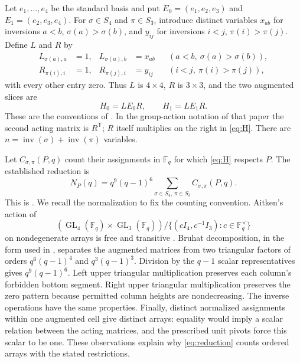 \documentclass[11pt]{article}
\newcommand{\F}{\mathbb F}
\newcommand{\inv}{\operatorname{inv}}
\newcommand{\GL}{\operatorname{GL}}
\begin{document}
Let $e_1,\ldots,e_4$ be the standard basis and put
$E_0=(e_1,e_2,e_3)$ and $E_1=(e_2,e_3,e_4)$.
For $\sigma\in S_4$ and $\pi\in S_3$, introduce distinct variables
$x_{ab}$ for inversions $a<b$, $\sigma(a)>\sigma(b)$, and $y_{ij}$
for inversions $i<j$, $\pi(i)>\pi(j)$. Define $L$ and $R$ by
\begin{align}
 L_{\sigma(a),a}&=1,&
 L_{\sigma(a),b}&=x_{ab}
       &&(a<b,\ \sigma(a)>\sigma(b)),\label{eq:L}\\
 R_{\pi(i),i}&=1,&
 R_{\pi(j),i}&=y_{ij}
       &&(i<j,\ \pi(i)>\pi(j)),\label{eq:R}
\end{align}
with every other entry zero. Thus $L$ is $4\times4$, $R$ is $3\times3$,
and the two augmented slices are
\begin{equation}\label{eq:H}
 H_0=LE_0R,\qquad H_1=LE_1R.
\end{equation}
These are the conventions of \cite[Definitions 4.5--4.7]{KL}.
In the group-action notation of that paper the second acting matrix is
$R^{\mathsf T}$; $R$ itself multiplies on the right in \eqref{eq:H}.
There are $n=\inv(\sigma)+\inv(\pi)$ variables.

Let $C_{\sigma,\pi}(P,q)$ count their assignments in $\F_q$ for which
\eqref{eq:H} respects $P$. The established reduction is
\begin{equation}\label{eq:reduction}
 N_P(q)=q^9(q-1)^6
       \sum_{\sigma\in S_4,\,\pi\in S_3}C_{\sigma,\pi}(P,q).
\end{equation}
This is \cite[Corollary 4.2]{KL}. We recall the normalization to fix the
counting convention. Aitken's action of
\[
 (\GL_4(\F_q)\times\GL_3(\F_q))/
 \{(cI_4,c^{-1}I_3):c\in\F_q^\times\}
\]
on nondegenerate arrays is free and transitive \cite{Aitken}.
Bruhat decomposition, in the form used in \cite[Theorem 4.3]{KL},
separates the augmented matrices from two triangular factors of orders
$q^6(q-1)^4$ and $q^3(q-1)^3$. Division by the $q-1$ scalar
representatives gives $q^9(q-1)^6$.
Left upper triangular multiplication preserves each column's forbidden
bottom segment. Right upper triangular multiplication preserves the zero
pattern because permitted column heights are nondecreasing. The inverse
operations have the same properties. Finally, distinct normalized
assignments within one augmented cell give distinct arrays: equality
would imply a scalar relation between the acting matrices, and the
prescribed unit pivots force this scalar to be one. These observations
explain why \eqref{eq:reduction} counts ordered arrays with the stated
restrictions.
\end{document}
